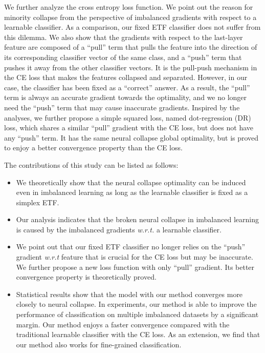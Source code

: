 \documentclass{article}
\newcommand{\<}{\left\langle}
\renewcommand{\>}{\right\rangle}
\begin{document}
We further analyze the cross entropy loss function. We point out the reason for minority collapse from the perspective of imbalanced gradients with respect to a learnable classifier. As a comparison, our fixed ETF classifier does not suffer from this dilemma. We also show that the gradients with respect to the last-layer feature are composed of a ``pull'' term that pulls the feature into the direction 
of its corresponding classifier vector of the same class,
and a ``push'' term that pushes it away from the other classifier vectors. It is the pull-push mechanism in the CE loss that makes the 
features collapsed and separated. 
However, in our case, the classifier has been fixed as a ``correct'' answer. As a result, the ``pull'' term is always an accurate gradient towards the optimality, and we no longer need the ``push'' term that may cause inaccurate gradients. Inspired by the analyses, we further propose a simple squared loss, named dot-regression (DR) loss, which shares a similar ``pull'' gradient with the CE loss, but does not have any ``push'' term. It has the same 
neural collapse global optimality,
but is proved to enjoy a  better convergence property than the CE loss. 


The contributions of this study can be listed as follows:
\begin{itemize}
	\vspace{-1mm}
\item We theoretically show that the neural collapse optimality can be induced even in imbalanced learning as long as the learnable classifier is fixed as a simplex ETF. 
	\item Our analysis indicates that the broken neural collapse in imbalanced learning is caused by the imbalanced gradients \emph{w.r.t.} a learnable classifier. 
	\item We point out that our fixed ETF classifier no longer relies on the ``push'' gradient \emph{w.r.t} feature that is crucial for the CE loss but may be inaccurate. We further propose a new loss function with only ``pull'' gradient. Its better convergence property is theoretically proved.  
	\item Statistical results show that the model with our method converges more closely to neural collapse. In experiments, our method is able to improve the performance of classification on multiple imbalanced datasets by a significant margin. Our method enjoys a faster convergence compared with the traditional learnable classifier with the CE loss. As an extension, we find that our method also works for fine-grained classification. 
\end{itemize}
\end{document}
